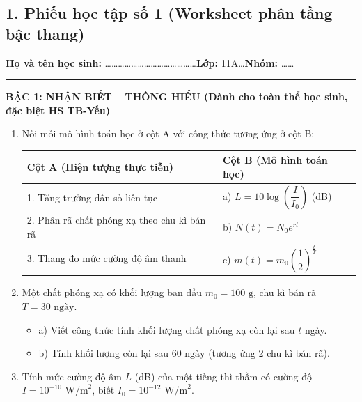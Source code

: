 \documentclass[12pt, a4paper]{article}
\begin{document}
\subsection*{1. Phiếu học tập số 1 (Worksheet phân tầng bậc thang)}

\begin{tcolorbox}[enhanced, colback=white, colframe=blue!70!black, arc=1.5mm, title=\textbf{PHIẾU HỌC TẬP: MỘT VÀI MÔ HÌNH TOÁN HỌC SỬ DỤNG HÀM SỐ MŨ VÀ LÔGARIT}]
\textbf{Họ và tên học sinh:} \dots\dots\dots\dots\dots\dots\dots\dots\dots\dots\dots\dots\dots\dots \textbf{Lớp:} 11A\dots \quad \textbf{Nhóm:} \dots\dots

\vspace{3pt}
\hrule
\vspace{5pt}

\textbf{\large BẬC 1: NHẬN BIẾT -- THÔNG HIỂU (Dành cho toàn thể học sinh, đặc biệt HS TB-Yếu)}
\begin{enumerate}[label=\textbf{Bài 1.\arabic*.}]
    \item Nối mỗi mô hình toán học ở cột A với công thức tương ứng ở cột B:
    \begin{center}
    \begin{tabular}{|p{7cm}|p{7cm}|}
    \hline
    \textbf{Cột A (Hiện tượng thực tiễn)} & \textbf{Cột B (Mô hình toán học)} \\
    \hline
    1. Tăng trưởng dân số liên tục & a) $L = 10 \log\left(\dfrac{I}{I_0}\right)$ (dB) \\
    \hline
    2. Phân rã chất phóng xạ theo chu kì bán rã & b) $N(t) = N_0 e^{rt}$ \\
    \hline
    3. Thang đo mức cường độ âm thanh & c) $m(t) = m_0 \left(\dfrac{1}{2}\right)^{\frac{t}{T}}$ \\
    \hline
    \end{tabular}
    \end{center}
    \item Một chất phóng xạ có khối lượng ban đầu $m_0 = 100\text{ g}$, chu kì bán rã $T = 30\text{ ngày}$.
    \begin{itemize}[leftmargin=0.6cm]
        \item a) Viết công thức tính khối lượng chất phóng xạ còn lại sau $t$ ngày.
        \item b) Tính khối lượng còn lại sau $60\text{ ngày}$ (tương ứng 2 chu kì bán rã).
    \end{itemize}
    \item Tính mức cường độ âm $L$ (dB) của một tiếng thì thầm có cường độ $I = 10^{-10}\text{ W/m}^2$, biết $I_0 = 10^{-12}\text{ W/m}^2$.
\end{enumerate}


\end{tcolorbox}
\end{document}

